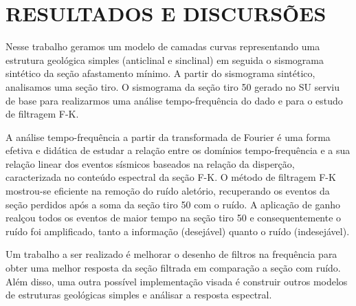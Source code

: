 \chapter{RESULTADOS E DISCURSÕES}
\label{cap4}

Nesse trabalho geramos um modelo de camadas curvas representando uma estrutura geológica simples (anticlinal e sinclinal) em seguida o sismograma sintético da seção afastamento mínimo. A partir do sismograma sintético, analisamos uma seção tiro. O sismograma da seção tiro 50 gerado no SU serviu de base para realizarmos uma análise tempo-frequência do dado e para o estudo de filtragem F-K.

A análise tempo-frequência  a partir da transformada de Fourier é uma forma efetiva e didática de estudar a relação entre os domínios tempo-frequência e a sua relação linear dos eventos sísmicos baseados na relação da disperção, caracterizada no conteúdo espectral da seção F-K. O método de filtragem F-K mostrou-se eficiente na remoção do ruído aletório, recuperando os eventos da seção perdidos após a soma da seção tiro 50 com o ruído. A aplicação de ganho realçou todos os eventos de maior tempo na seção tiro 50 e consequentemente o ruído foi amplificado, tanto a informação (desejável) quanto o ruído (indesejável).

Um trabalho a ser realizado é melhorar o desenho de filtros na frequência para obter uma melhor resposta da seção filtrada em comparação a seção com ruído. Além disso, uma outra possível implementação visada é construir outros modelos de estruturas geológicas simples e análisar a resposta espectral.